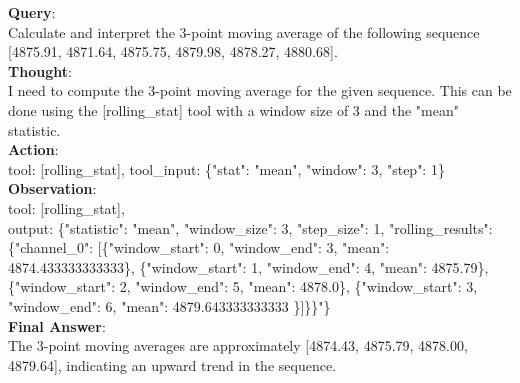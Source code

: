 \begin{tcolorbox}[
  colback=white,
  colframe=black!50,
  boxrule=0.3mm,
  width=\textwidth,
  rounded corners,
  title=Sample 2: Statistical Analysis,
  fonttitle=\bfseries,
  left=2mm, right=2mm, top=2mm, bottom=2mm
]
\textbf{Query}:\\
Calculate and interpret the 3-point moving average of the following sequence [4875.91, 4871.64, 4875.75, 4879.98, 4878.27, 4880.68]. \\

\textbf{Thought}:\\
I need to compute the 3-point moving average for the given sequence. This can be done using the [rolling\_stat] tool with a window size of 3 and the "mean" statistic.\\

\textbf{Action}:\\
tool: [rolling\_stat], tool\_input: \{"stat": "mean", "window": 3, "step": 1\}\\

\textbf{Observation}: \\
tool: [rolling\_stat], 
\\
output: \{"statistic": "mean", "window\_size": 3, "step\_size": 1, "rolling\_results": \{"channel\_0": [\{"window\_start": 0, "window\_end": 3, "mean": 4874.433333333333\}, \{"window\_start": 1, "window\_end": 4, "mean": 4875.79\}, \{"window\_start": 2, "window\_end": 5, "mean": 4878.0\}, \{"window\_start": 3, "window\_end": 6, "mean": 4879.643333333333
\}]\}\}"\} \\

\textbf{Final Answer}: \\
The 3-point moving averages are approximately [4874.43, 4875.79, 4878.00, 4879.64], indicating an upward trend in the sequence.
\end{tcolorbox}

